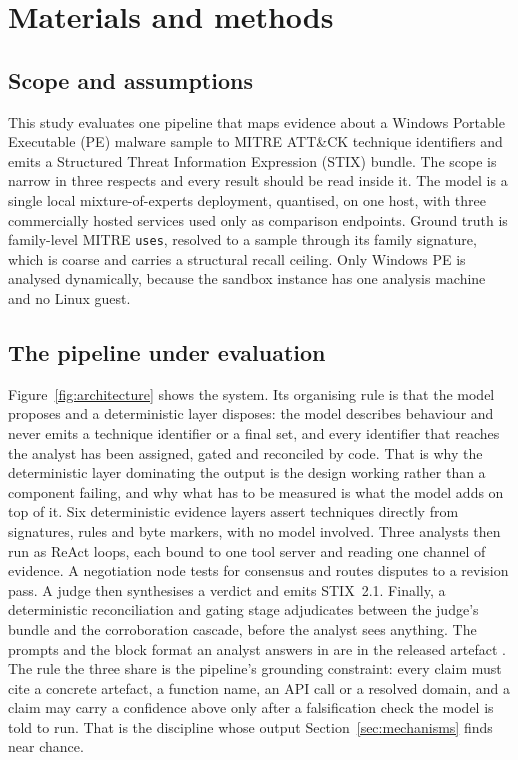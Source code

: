 \section{Materials and methods}
\label{sec:method}

\subsection{Scope and assumptions}\label{scope-and-assumptions}

This study evaluates one pipeline that maps evidence about a Windows Portable Executable (PE)
malware sample to MITRE
ATT\&CK technique identifiers and emits a Structured Threat Information Expression (STIX) bundle.
The scope is narrow in three respects and
every result should be read inside it. The model is a single local mixture-of-experts deployment,
quantised, on one host, with three commercially hosted services used only as comparison endpoints.
Ground truth is family-level MITRE \texttt{uses}, resolved to a sample through its family signature,
which is coarse and carries a structural recall ceiling. Only Windows PE is analysed dynamically,
because the sandbox instance has one analysis machine and no Linux guest.

\subsection{The pipeline under evaluation}\label{the-pipeline-under-evaluation}

Figure~\ref{fig:architecture} shows the system. Its organising rule is that the model proposes and
a deterministic layer disposes: the model describes behaviour and never emits a technique identifier
or a final set, and every identifier that reaches the analyst has been assigned, gated and
reconciled by code. That is why the deterministic layer dominating the output is the design working
rather than a component failing, and why what has to be measured is what the model adds on top of
it. Six deterministic evidence layers assert techniques directly from signatures, rules and byte
markers, with no model involved. Three analysts then run as ReAct loops, each bound to one tool server and reading one channel of
evidence. A negotiation node tests for consensus and routes disputes to a revision pass. A judge
then synthesises a verdict and emits STIX~2.1. Finally, a deterministic reconciliation and gating stage adjudicates between the judge's bundle and
the corroboration cascade, before the analyst sees anything. The prompts and the block format an
analyst answers in are in the released artefact \citep{release2026artefact}. The rule the three share
is the pipeline's grounding constraint: every claim must cite a concrete artefact, a function name,
an API call or a resolved domain, and a claim may carry a confidence above  only after
a falsification check the model is told to run. That is the discipline whose output
Section~\ref{sec:mechanisms} finds near chance.

